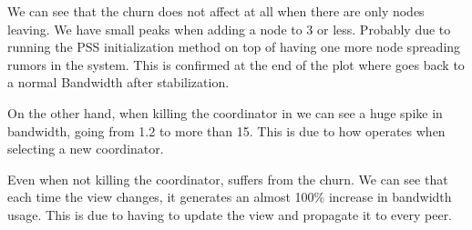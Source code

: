 We can see that the churn does not affect \epto at all when there are only nodes leaving. We have small peaks when adding a node to \SI{3}{\mbps} or less. Probably due to running the PSS initialization method on top of having one more node spreading rumors in the system. This is confirmed at the end of the plot where \epto goes back to a normal Bandwidth after stabilization.

On the other hand, when killing the coordinator in \jgroups we can see a huge spike in bandwidth, going from \SI{1.2}{\mbps} to more than \SI{15}{\mbps}. This is due to how \jgroups operates when selecting a new coordinator.

Even when not killing the coordinator, \jgroups suffers from the churn. We can see that each time the view changes, it generates an almost 100\% increase in bandwidth usage. This is due to \jgroups having to update the view and propagate it to every peer.


